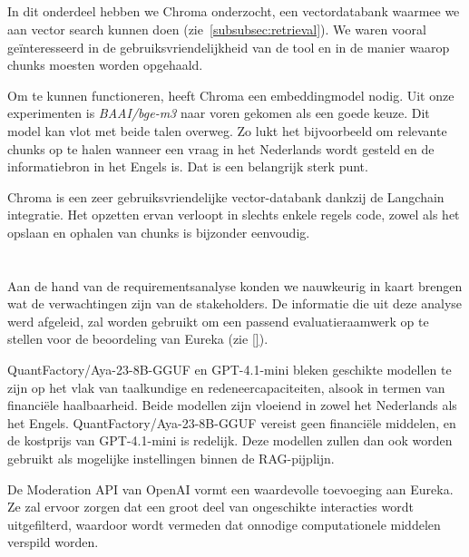 \subsection{}%
\label{subsec:onderzoek-indexing}

In dit onderdeel hebben we Chroma onderzocht, een vectordatabank waarmee we aan vector search kunnen doen (zie~\ref{subsubsec:retrieval}). We waren vooral geïnteresseerd in de gebruiksvriendelijkheid van de tool en in de manier waarop chunks moesten worden opgehaald.

Om te kunnen functioneren, heeft Chroma een embeddingmodel nodig. Uit onze experimenten is \emph{BAAI/bge-m3} naar voren gekomen als een goede keuze. Dit model kan vlot met beide talen overweg. Zo lukt het bijvoorbeeld om relevante chunks op te halen wanneer een vraag in het Nederlands wordt gesteld en de informatiebron in het Engels is. Dat is een belangrijk sterk punt.

Chroma is een zeer gebruiksvriendelijke vector-databank dankzij de Langchain integratie. Het opzetten ervan verloopt in slechts enkele regels code, zowel als het opslaan en ophalen van chunks is bijzonder eenvoudig.

\section{}%
\label{onderzoek-besluit}

Aan de hand van de requirementsanalyse konden we nauwkeurig in kaart brengen wat de verwachtingen zijn van de stakeholders. De informatie die uit deze analyse werd afgeleid, zal worden gebruikt om een passend evaluatieraamwerk op te stellen voor de beoordeling van Eureka (zie \ref{}).

QuantFactory/Aya-23-8B-GGUF en GPT-4.1-mini bleken geschikte modellen te zijn op het vlak van taalkundige en redeneercapaciteiten, alsook in termen van financiële haalbaarheid. Beide modellen zijn vloeiend in zowel het Nederlands als het Engels. QuantFactory/Aya-23-8B-GGUF vereist geen financiële middelen, en de kostprijs van GPT-4.1-mini is redelijk. Deze modellen zullen dan ook worden gebruikt als mogelijke instellingen binnen de RAG-pijplijn.

De Moderation API van OpenAI vormt een waardevolle toevoeging aan Eureka. Ze zal ervoor zorgen dat een groot deel van ongeschikte interacties wordt uitgefilterd, waardoor wordt vermeden dat onnodige computationele middelen verspild worden.

